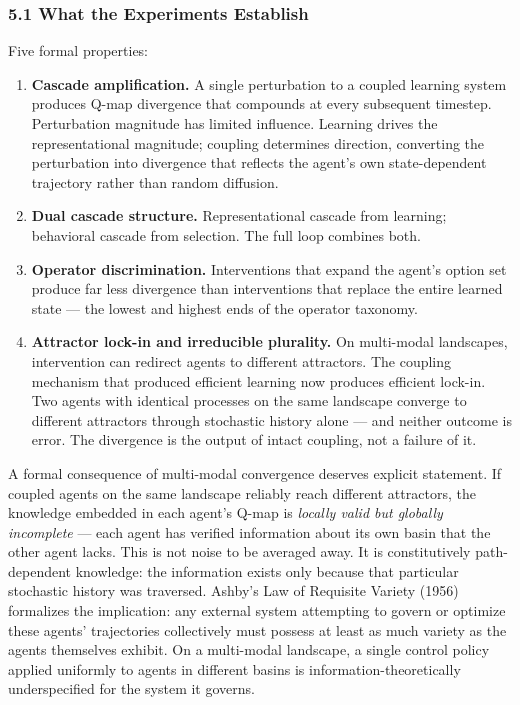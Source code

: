 \documentclass[
]{article}
\begin{document}
\subsubsection{5.1 What the Experiments
Establish}\label{what-the-experiments-establish}

Five formal properties:

\begin{enumerate}
\def\labelenumi{\arabic{enumi}.}
\item
  \textbf{Cascade amplification.} A single perturbation to a coupled
  learning system produces Q-map divergence that compounds at every
  subsequent timestep. Perturbation magnitude has limited influence.
  Learning drives the representational magnitude; coupling determines
  direction, converting the perturbation into divergence that reflects
  the agent's own state-dependent trajectory rather than random
  diffusion.
\item
  \textbf{Dual cascade structure.} Representational cascade from
  learning; behavioral cascade from selection. The full loop combines
  both.
\item
  \textbf{Operator discrimination.} Interventions that expand the
  agent's option set produce far less divergence than interventions that
  replace the entire learned state --- the lowest and highest ends of
  the operator taxonomy.
\item
  \textbf{Attractor lock-in and irreducible plurality.} On multi-modal
  landscapes, intervention can redirect agents to different attractors.
  The coupling mechanism that produced efficient learning now produces
  efficient lock-in. Two agents with identical processes on the same
  landscape converge to different attractors through stochastic history
  alone --- and neither outcome is error. The divergence is the output
  of intact coupling, not a failure of it.
\end{enumerate}

A formal consequence of multi-modal convergence deserves explicit
statement. If coupled agents on the same landscape reliably reach
different attractors, the knowledge embedded in each agent's Q-map is
\emph{locally valid but globally incomplete} --- each agent has verified
information about its own basin that the other agent lacks. This is not
noise to be averaged away. It is constitutively path-dependent
knowledge: the information exists only because that particular
stochastic history was traversed. Ashby's Law of Requisite Variety
(1956) formalizes the implication: any external system attempting to
govern or optimize these agents' trajectories collectively must possess
at least as much variety as the agents themselves exhibit. On a
multi-modal landscape, a single control policy applied uniformly to
agents in different basins is information-theoretically underspecified
for the system it governs.
\end{document}

